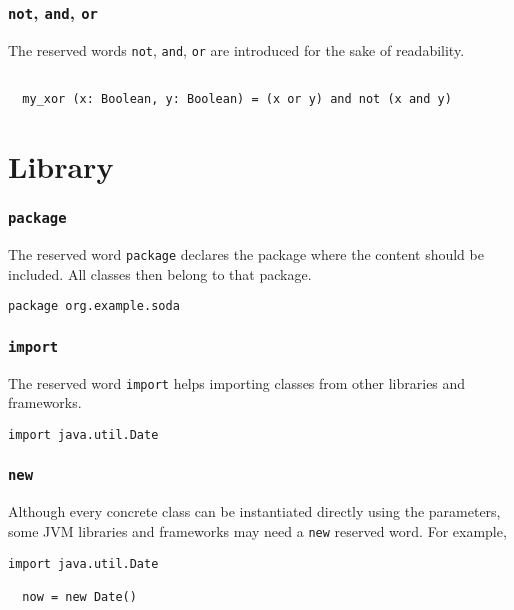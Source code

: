 \documentclass[12pt,a4paper]{book}
\newcommand{\srccode}[1]{\texttt{{#1}}}
\newcommand{\reservedWord}[1]{{\color{blue}\srccode{#1}}\xspace}
\newcommand{\snot}{\reservedWord{not}}
\newcommand{\sand}{\reservedWord{and}}
\newcommand{\sor}{\reservedWord{or}}
\newcommand{\spackage}{\reservedWord{package}}
\newcommand{\simport}{\reservedWord{import}}
\newcommand{\snew}{\reservedWord{new}}
\begin{document}
    \subsubsection{\snot, \sand, \sor}

    The reserved words \snot, \sand, \sor are introduced for the sake of readability.

    \begin{lstlisting}[label={lst:exampleNotAndOr}]

  my_xor (x: Boolean, y: Boolean) = (x or y) and not (x and y)

    \end{lstlisting}


    \section{Library}

    \subsubsection{\spackage}

    The reserved word \spackage declares the package where the content should be included.
    All classes then belong to that package.

    \begin{lstlisting}[label={lst:examplePackage}]
  package org.example.soda
    \end{lstlisting}

    \subsubsection{\simport}

    The reserved word \simport helps importing classes from other libraries and frameworks.

    \begin{lstlisting}[label={lst:exampleImport}]
  import java.util.Date
    \end{lstlisting}

    \subsubsection{\snew}

    Although every concrete class can be instantiated directly using the parameters, some JVM libraries and frameworks may need a \snew reserved word.
    For example,

    \begin{lstlisting}[label={lst:exampleImportDate}]
  import java.util.Date

  now = new Date()
    \end{lstlisting}
\end{document}
